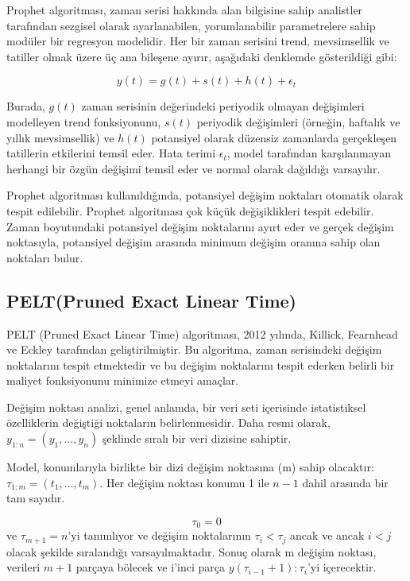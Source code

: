 \documentclass[12pt,twoside]{deuthesis}
\begin{document}
Prophet algoritması, zaman serisi hakkında alan bilgisine sahip analistler tarafından sezgisel olarak ayarlanabilen, yorumlanabilir parametrelere sahip modüler bir regresyon modelidir. Her bir zaman serisini trend, mevsimsellik ve tatiller olmak üzere üç ana bileşene ayırır, aşağıdaki denklemde gösterildiği gibi:

\[ y(t) = g(t) + s(t) + h(t) + \epsilon_t \]

Burada, \(g(t)\) zaman serisinin değerindeki periyodik olmayan değişimleri modelleyen trend fonksiyonunu, \(s(t)\) periyodik değişimleri (örneğin, haftalık ve yıllık mevsimsellik) ve \(h(t)\) potansiyel olarak düzensiz zamanlarda gerçekleşen tatillerin etkilerini temsil eder. Hata terimi \(\epsilon_t\), model tarafından karşılanmayan herhangi bir özgün değişimi temsil eder ve normal olarak dağıldığı varsayılır.

Prophet algoritması kullanıldığında, potansiyel değişim noktaları otomatik olarak tespit edilebilir. Prophet algoritması çok küçük değişiklikleri tespit edebilir. Zaman boyutundaki potansiyel değişim noktalarını ayırt eder ve gerçek değişim noktasıyla, potansiyel değişim arasında minimum değişim oranına sahip olan noktaları bulur.

\hypertarget{peltpruned-exact-linear-time}{%
\subsection{PELT(Pruned Exact Linear Time)}\label{peltpruned-exact-linear-time}}

PELT (Pruned Exact Linear Time) algoritması, 2012 yılında, Killick, Fearnhead ve Eckley tarafından geliştirilmiştir. Bu algoritma, zaman serisindeki değişim noktalarını tespit etmektedir ve bu değişim noktalarını tespit ederken belirli bir maliyet fonksiyonunu minimize etmeyi amaçlar.

Değişim noktası analizi, genel anlamda, bir veri seti içerisinde istatistiksel özelliklerin değiştiği noktaların belirlenmesidir. Daha resmi olarak, \(y_{1:n} = (y_1, \ldots, y_n)\) şeklinde sıralı bir veri dizisine sahiptir.

Model, konumlarıyla birlikte bir dizi değişim noktasına (m) sahip olacaktır: \(\tau_{1:m} = (t_1, \ldots, t_m)\). Her değişim noktası konumu 1 ile \(n - 1\) dahil arasında bir tam sayıdır.

\[ \tau_0 = 0 \] ve \(\tau_{m+1} = n\)'yi tanımlıyor ve değişim noktalarının \(\tau_i < \tau_j\) ancak ve ancak \(i < j\) olacak şekilde sıralandığı varsayılmaktadır. Sonuç olarak m değişim noktası, verileri \(m + 1\) parçaya bölecek ve i'inci parça \(y(\tau_{i-1}+1):\tau_i\)'yi içerecektir.
\end{document}
